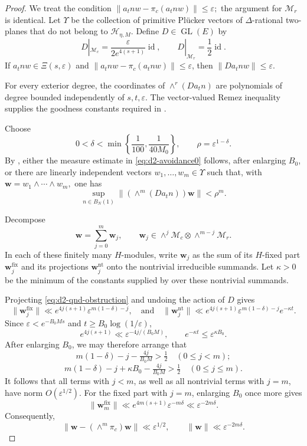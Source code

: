 \documentclass[reqno,11pt]{amsart}
\theoremstyle{definition}
\theoremstyle{remark}
\numberwithin{equation}{section}
\newcommand{\GL}{\operatorname{GL}}
\begin{document}
\begin{proof}
We treat the condition
$
\|a_tnw-\pi_c(a_tnw)\|\le\varepsilon;
$
the argument for $\mathcal M_r$ is identical. Let $\Upsilon$ be the
collection of primitive Pl\"ucker vectors of $\Delta$-rational two-planes
that do not belong to $\mathcal H_{\eta,M}$. Define $D\in\GL(E)$ by
$$
D|_{\mathcal M_c}
=
\frac{\varepsilon}{2e^{4(s+1)}}\operatorname{id},
\qquad
D|_{\mathcal M_r}
=
\frac12\operatorname{id}.
$$
If $a_tnw\in\Xi(s,\varepsilon)$ and
$\|a_tnw-\pi_c(a_tnw)\|\le\varepsilon$, then
$\|Da_tnw\|\le\varepsilon$.

For every exterior degree, the coordinates of
$\wedge^r(Da_tn)$ are polynomials of degree bounded independently of
$s,t,\varepsilon$. The vector-valued Remez inequality supplies the
goodness constants required in
.

Choose
$$
0<\delta<
\min\left\{
\frac1{100},\frac1{40M_0}
\right\},
\qquad
\rho=\varepsilon^{1-\delta}.
$$
By , either the measure estimate in
\eqref{eq:d2-avoidance0} follows, after enlarging $B_0$, or there are
linearly independent vectors $w_1,\ldots,w_m\in\Upsilon$ such that, with
$
\mathbf w=w_1\wedge\cdots\wedge w_m,
$
one has
\begin{equation}\label{eq:d2-qnd-obstruction}
\sup_{n\in B_N(1)}
\|(\wedge^m(Da_tn))\mathbf w\|
<
\rho^m.
\end{equation}

Decompose
$$
\mathbf w
=
\sum_{j=0}^m\mathbf w_j,
\qquad
\mathbf w_j
\in
\wedge^j\mathcal M_c
\otimes
\wedge^{m-j}\mathcal M_r.
$$
In each of these finitely many $H$-modules, write
$\mathbf w_j$ as the sum of its $H$-fixed part
$\mathbf w_j^{\operatorname{fix}}$ and its projections
$\mathbf w_j^{\operatorname{nt}}$ onto the nontrivial irreducible summands.
Let $\kappa>0$ be the minimum of the constants supplied by
 over these nontrivial summands.

Projecting \eqref{eq:d2-qnd-obstruction} and undoing the action of $D$
gives
$$
\|\mathbf w_j^{\operatorname{fix}}\|
\ll
e^{4j(s+1)}\varepsilon^{m(1-\delta)-j},
\quad\text{and}\quad
\|\mathbf w_j^{\operatorname{nt}}\|
\ll
e^{4j(s+1)}\varepsilon^{m(1-\delta)-j}e^{-\kappa t}.
$$
Since $\varepsilon<e^{-B_0Ms}$ and
$t\ge B_0\log(1/\varepsilon)$,
$$
e^{4j(s+1)}
\ll
\varepsilon^{-4j/(B_0M)},
\qquad
e^{-\kappa t}
\le
\varepsilon^{\kappa B_0}.
$$
After enlarging $B_0$, we may therefore arrange that
$$
m(1-\delta)-j-\tfrac{4j}{B_0M}
>
\tfrac12 \quad (0\le j <m) ;$$
$$ m(1-\delta)-j+\kappa B_0-\tfrac{4j}{B_0M}
>
\tfrac12
\quad 
(0\le j\le m).
$$
It follows that all terms with $j<m$, as well as all nontrivial terms with
$j=m$, have norm $O(\varepsilon^{1/2})$. For the fixed part with $j=m$,
enlarging $B_0$ once more gives
$$
\|\mathbf w_m^{\operatorname{fix}}\|
\ll
e^{4m(s+1)}\varepsilon^{-m\delta}
\ll
\varepsilon^{-2m\delta}.
$$
Consequently,
\begin{equation}\label{eq:d2-wedge-ruling-close}
\|\mathbf w-(\wedge^m\pi_c)\mathbf w\|
\ll
\varepsilon^{1/2},
\qquad
\|\mathbf w\|
\ll
\varepsilon^{-2m\delta}.
\end{equation}


\end{proof}
\end{document}
